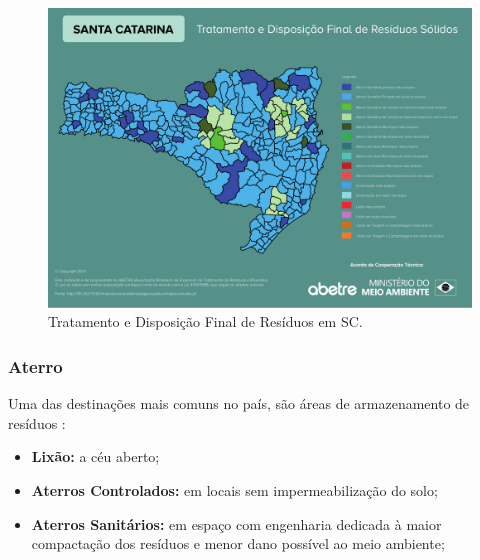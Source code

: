 \begin{figure}[h]
	\caption{\label{fig:Fig_1} Tratamento e Disposição Final de Resíduos em SC.}
	\begin{center}
		\includegraphics[scale=0.52]{images/abetre_sc.pdf}
	\end{center}
\end{figure}

\pagebreak
\subsubsection{Aterro}

Uma das destinações mais comuns no país, são áreas de armazenamento de resíduos \cite{diagnostico_cristine}:
\begin{itemize} 
	\item \textbf{Lixão:} a céu aberto;
	\item \textbf{Aterros Controlados:} em locais sem impermeabilização do solo;
	\item \textbf{Aterros Sanitários:} em espaço com engenharia dedicada à maior compactação dos resíduos e menor dano possível ao meio ambiente;
\end{itemize}
